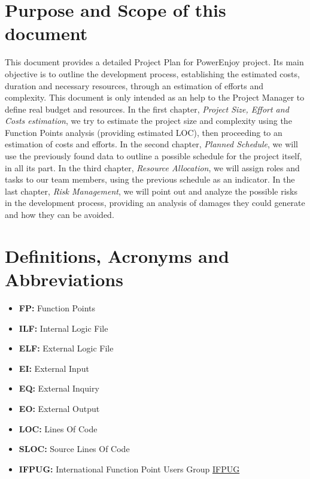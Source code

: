 \section{Purpose and Scope of this document}
This document provides a detailed Project Plan for PowerEnjoy project. Its main objective is to outline the development process, establishing the estimated costs, duration and necessary resources, through an estimation of efforts and complexity. This document is only intended as an help to the Project Manager to define real budget and resources. 
\bigbreak
In the first chapter, \textit{Project Size, Effort and Costs estimation}, we try to estimate the project size and complexity using the Function Points analysis (providing estimated LOC), then proceeding to an estimation of costs and efforts. 
\bigbreak
In the second chapter, \textit{Planned Schedule}, we will use the previously found data to outline a possible schedule for the project itself, in all its part. 
\bigbreak
In the third chapter, \textit{Resource Allocation}, we will assign roles and tasks to our team members, using the previous schedule as an indicator.
\bigbreak
In the last chapter, \textit{Risk Management}, we will point out and analyze the possible risks in the development process, providing an analysis of damages they could generate and how they can be avoided. 

\section{Definitions, Acronyms and Abbreviations}
\begin{itemize}
\item \textbf{FP:} Function Points
\item \textbf{ILF:} Internal Logic File
\item \textbf{ELF:} External Logic File
\item \textbf{EI:} External Input
\item \textbf{EQ:} External Inquiry
\item \textbf{EO:} External Output
\item \textbf{LOC:} Lines Of Code
\item \textbf{SLOC:} Source Lines Of Code
\item \textbf{IFPUG:} International Function Point Users Group \href{http://www.ifpug.org}{IFPUG}
\end{itemize}

